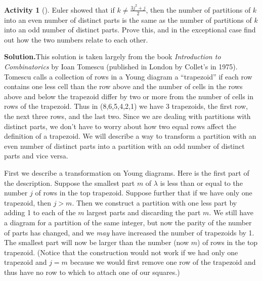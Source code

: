 \documentclass[10pt,]{book}
\theoremstyle{plain}
\theoremstyle{definition}
\newtheorem{activity}[project]{Activity}
\numberwithin{equation}{chapter}
\begin{document}
\begin{activity}[]\label{activity-150}
Euler showed that if \(k\not= \frac{3j^2+j}{2}\), then the number of partitions of \(k\) into an even number of distinct parts is the same as the number of partitions of \(k\) into an odd number of distinct parts. Prove this, and in the exceptional case find out how the two numbers relate to each other.%
\par\medskip\noindent%
\textbf{Solution.}\quad This solution is taken largely from the book \textsl{Introduction to Combinatorics} by Ioan Tomescu (published in London by Collet's in 1975). Tomescu calls a collection of rows in a Young diagram a ``trapezoid'' if each row contains one less cell than the row above and the number of cells in the rows above and below the trapezoid differ by two or more from the number of cells in rows of the trapezoid. Thus in (8,6,5,4,2,1) we have 3 trapezoids, the first row, the next three rows, and the last two. Since we are dealing with partitions with distinct parts, we don't have to worry about how two equal rows affect the definition of a trapezoid. We will describe a way to transform a partition with an even number of distinct parts into a partition with an odd number of distinct parts and vice versa.%
\par
First we describe a transformation on Young diagrams. Here is the first part of the description. Suppose the smallest part \(m\) of \(\lambda\) is less than or equal to the number \(j\) of rows in the top trapezoid. Suppose further that if we have only one trapezoid, then \(j>m\). Then we construct a partition with one less part by adding 1 to each of the \(m\) largest parts and discarding the part \(m\). We still have a diagram for a partition of the same integer, but now the parity of the number of parts has changed, and we \emph{may} have increased the number of trapezoids by 1. The smallest part will now be larger than the number (now \(m\)) of rows in the top trapezoid. (Notice that the construction would not work if we had only one trapezoid and \(j=m\) because we would first remove one row of the trapezoid and thus have no row to which to attach one of our squares.)%
\par

\end{activity}
\end{document}
